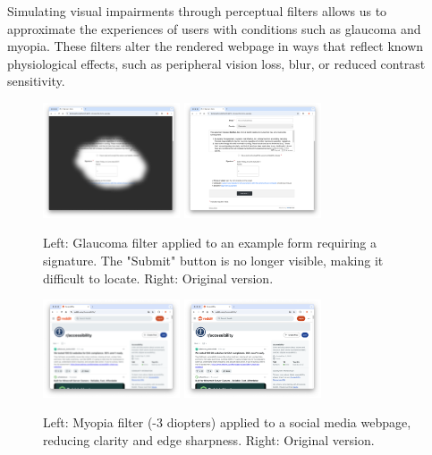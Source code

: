 Simulating visual impairments through perceptual filters allows us to approximate the experiences of users with conditions such as glaucoma and myopia. These filters alter the rendered webpage in ways that reflect known physiological effects, such as peripheral vision loss, blur, or reduced contrast sensitivity.

\begin{figure}
    \centering
    \includegraphics[width=115pt]{imgs/glaucoma-filter.png}
    \includegraphics[width=115pt]{imgs/no-glaucoma-filter.png}
    \caption{Left: Glaucoma filter applied to an example form requiring a signature. The "Submit" button is no longer visible, making it difficult to locate. Right: Original version.}
    \label{fig:glaucoma-filters}
\end{figure}

\begin{figure}
    \centering
    \includegraphics[width=115pt]{imgs/myopia-filter.png}
    \includegraphics[width=115pt]{imgs/no-myopia-filter.png}
    \caption{Left: Myopia filter (-3 diopters) applied to a social media webpage, reducing clarity and edge sharpness. Right: Original version.}
    \label{fig:myopia-filters}
\end{figure}

